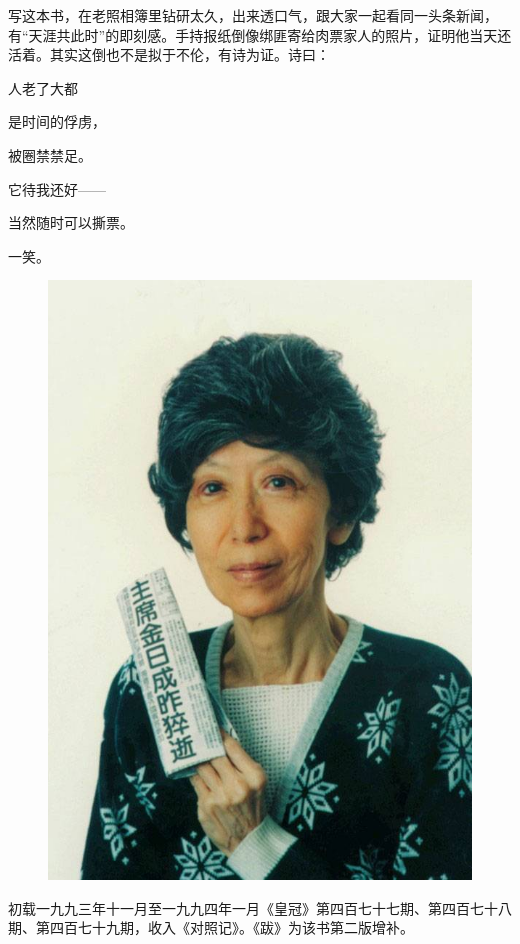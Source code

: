 \par 写这本书，在老照相簿里钻研太久，出来透口气，跟大家一起看同一头条新闻，有“天涯共此时”的即刻感。手持报纸倒像绑匪寄给肉票家人的照片，证明他当天还活着。其实这倒也不是拟于不伦，有诗为证。诗曰：
\par 人老了大都
\par 是时间的俘虏，
\par 被圈禁禁足。
\par 它待我还好——
\par 当然随时可以撕票。
\par 一笑。

\begin{figure}[htb]
    \centering %
    \includegraphics[scale=0.4]{picture/对照记55.jpeg}
\end{figure}


\par *初载一九九三年十一月至一九九四年一月《皇冠》第四百七十七期、第四百七十八期、第四百七十九期，收入《对照记》。《跋》为该书第二版增补。



